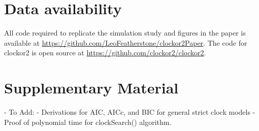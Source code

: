 \documentclass{article}
\begin{document}
\section*{Data availability}
All code required to replicate the simulation study and figures in the paper is available at \url{https://github.com/LeoFeatherstone/clockor2Paper}. The code for clockor2 is open source at \url{https://github.com/clockor2/clockor2}.



\section*{Supplementary Material}
- To Add:
- Derivations for AIC, AICc, and BIC for general strict clock models
- Proof of polynomial time for clockSearch() algorithm.
\end{document}
